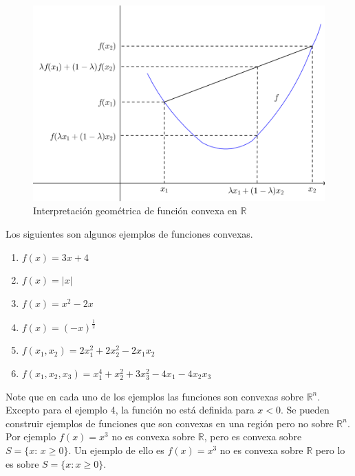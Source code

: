 \begin{figure}[h]
   \centering
   \includegraphics{./partes/sub_sec/codigo-image/f_convx.png}
   \caption{{\footnotesize Interpretaci\'on geom\'etrica de funci\'on convexa en $\mathbb{R}$ \cite{apoyo}}}
   \label{f-convx}
\end{figure}


Los siguientes son algunos ejemplos de funciones convexas.\\

\begin{enumerate}
   \item $f(x) = 3x + 4$
   \item $f(x) = |x|$
   \item $f(x) = x^2 - 2x$
   \item $f(x) =  \displaystyle \left( -x \right)^\frac{1}{2}$
   \item $f(x_1, x_2) = 2x_{1}^2 + 2x_{2}^2 - 2 x_1 x_2$
   \item $f(x_1, x_2, x_3) = x_{1}^{4} + x_{2}^{2} + 3x_{3}^{2} - 4x_1 - 4x_{2} x_{3}$
\end{enumerate}


Note que en cada uno de los ejemplos las funciones son convexas sobre $\mathbb{R}^n$. Excepto para el ejemplo 4, la funci\'on no est\'a
definida para $x < 0.$ Se pueden construir ejemplos de funciones que son convexas en una regi\'on pero no sobre $\mathbb{R}^n$. Por
ejemplo $f(x) = x^3$  no es convexa sobre $\mathbb{R}$, pero es convexa sobre $S= \{x:\, x \geqslant 0\}.$ Un ejemplo de ello es $f(x) = x^3$
no es convexa sobre $\mathbb{R}$ pero lo es sobre $S = \{x: x \geqslant 0\}.$\\ \\

